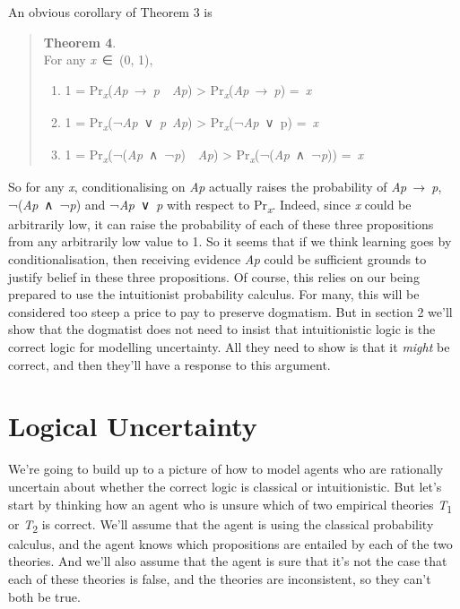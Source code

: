 \documentclass[
  10pt,
  letterpaper,
  DIV=11,
  numbers=noendperiod,
  twoside]{scrartcl}
\providecommand{\tightlist}{%
  \setlength{\itemsep}{0pt}\setlength{\parskip}{0pt}}\usepackage{longtable,booktabs,array}
\begin{document}
An obvious corollary of Theorem 3 is

\begin{quote}
\textbf{Theorem 4}.\\
For any \emph{x}~∈~(0, 1),

\begin{enumerate}
\def\labelenumi{\arabic{enumi}.}
\tightlist
\item
  1 =
  Pr\textsubscript{\emph{x}}(\emph{Ap}~→~\emph{p}~\textbar~\emph{Ap})
  \textgreater{} Pr\textsubscript{\emph{x}}(\emph{Ap}~→~\emph{p})
  =~\emph{x}
\item
  1 =
  Pr\textsubscript{\emph{x}}(¬\emph{Ap}~∨~\emph{p}\textbar~\emph{Ap})
  \textgreater{} Pr\textsubscript{\emph{x}}(¬\emph{Ap}~∨~p) =~\emph{x}
\item
  1 =
  Pr\textsubscript{\emph{x}}(¬(\emph{Ap}~∧~¬\emph{p})~\textbar~\emph{Ap})
  \textgreater{} Pr\textsubscript{\emph{x}}(¬(\emph{Ap}~∧~¬\emph{p}))
  =~\emph{x}
\end{enumerate}
\end{quote}

So for any \emph{x}, conditionalising on \emph{Ap} actually raises the
probability of \emph{Ap}~→~\emph{p}, ¬(\emph{Ap}~∧~¬\emph{p}) and
¬\emph{Ap}~∨~\emph{p} with respect to Pr\textsubscript{\emph{x}}.
Indeed, since \emph{x} could be arbitrarily low, it can raise the
probability of each of these three propositions from any arbitrarily low
value to 1. So it seems that if we think learning goes by
conditionalisation, then receiving evidence \emph{Ap} could be
sufficient grounds to justify belief in these three propositions. Of
course, this relies on our being prepared to use the intuitionist
probability calculus. For many, this will be considered too steep a
price to pay to preserve dogmatism. But in section 2 we'll show that the
dogmatist does not need to insist that intuitionistic logic is the
correct logic for modelling uncertainty. All they need to show is that
it \emph{might} be correct, and then they'll have a response to this
argument.

\section{Logical Uncertainty}\label{logical-uncertainty}

We're going to build up to a picture of how to model agents who are
rationally uncertain about whether the correct logic is classical or
intuitionistic. But let's start by thinking how an agent who is unsure
which of two empirical theories \emph{T}\textsubscript{1} or
\emph{T}\textsubscript{2} is correct. We'll assume that the agent is
using the classical probability calculus, and the agent knows which
propositions are entailed by each of the two theories. And we'll also
assume that the agent is sure that it's not the case that each of these
theories is false, and the theories are inconsistent, so they can't both
be true.
\end{document}
